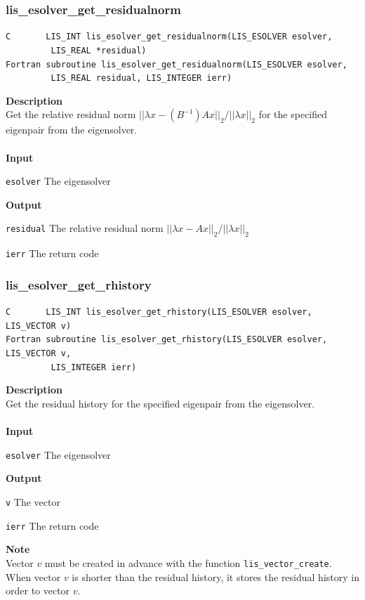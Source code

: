 \documentclass[a4paper]{article}
\newcommand{\namelistlabel}[1]{\mbox{#1}\hfill}
\newenvironment{namelist}[1]{%
\begin{list}{}
  {\let\makelabel\namelistlabel
  \settowidth{\labelwidth}{#1}
  \setlength{\leftmargin}{1.1\labelwidth}}
  }{%
\end{list}}
\begin{document}
\subsubsection{lis\_esolver\_get\_residualnorm}
\begin{screen}
\verb|C       LIS_INT lis_esolver_get_residualnorm(LIS_ESOLVER esolver,|\\
\verb|         LIS_REAL *residual)|\\
\verb|Fortran subroutine lis_esolver_get_residualnorm(LIS_ESOLVER esolver,|\\
\verb|         LIS_REAL residual, LIS_INTEGER ierr)|
\end{screen}
{\bf Description}\\
\indent
Get the relative residual norm $||\lambda x-(B^{-1})Ax||_2/||\lambda x||_2$ for the specified eigenpair from the eigensolver.
\\ \\
\noindent
{\bf Input}
\begin{namelist}{XXXXXXXXXXXXXXXXXXXX}
\item[\tt esolver] The eigensolver
\end{namelist}
{\bf Output}
\begin{namelist}{XXXXXXXXXXXXXXXXXXXX}
\item[\tt residual]  The relative residual norm $||\lambda x-Ax||_2/||\lambda x||_2$
\item[\tt ierr] The return code
\end{namelist}

\newpage
\subsubsection{lis\_esolver\_get\_rhistory}
\begin{screen}
\verb|C       LIS_INT lis_esolver_get_rhistory(LIS_ESOLVER esolver, LIS_VECTOR v)|\\
\verb|Fortran subroutine lis_esolver_get_rhistory(LIS_ESOLVER esolver, LIS_VECTOR v,|\\
\verb|         LIS_INTEGER ierr)|
\end{screen}
{\bf Description}\\
\indent
Get the residual history for the specified eigenpair from the eigensolver.
\\ \\
\noindent
{\bf Input}
\begin{namelist}{XXXXXXXXXXXXXXXXXXXX}
\item[\tt esolver] The eigensolver
\end{namelist}
{\bf Output}
\begin{namelist}{XXXXXXXXXXXXXXXXXXXX}
\item[\tt v] The vector
\item[\tt ierr] The return code
\end{namelist}
{\bf Note}\\
\indent
Vector $v$ must be created in advance with the function \verb|lis_vector_create|. 
When vector $v$ is shorter than the residual history, 
it stores the residual history in order to vector $v$.
\end{document}
